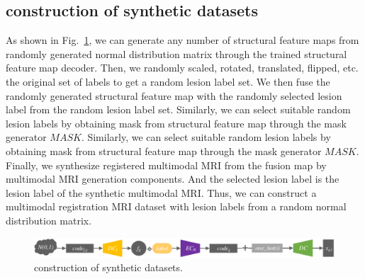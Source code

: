 \documentclass[letterpaper]{article} %
\begin{document}
\subsection{construction of synthetic datasets}
\label{make dataset}
As shown in Fig.~\ref{make_data}, we can generate any number of structural feature maps from randomly generated normal distribution matrix through the trained structural feature map decoder. Then, we randomly scaled, rotated, translated, flipped, etc. the original set of labels to get a random lesion label set. We then fuse the randomly generated structural feature map with the randomly selected lesion label from the random lesion label set. Similarly, we can select suitable random lesion labels by obtaining mask from structural feature map through the mask generator $MASK$. Similarly, we can select suitable random lesion labels by obtaining mask from structural feature map through the mask generator $MASK$. Finally, we synthesize registered multimodal MRI from the fusion map by multimodal MRI generation components. And the selected lesion label is the lesion label of the synthetic multimodal MRI. Thus, we can construct a multimodal registration MRI dataset with lesion labels from a random normal distribution matrix.
\begin{figure}
	\centering
	\includegraphics[width=0.98\columnwidth]{figures/make_data}
	\caption{construction of synthetic datasets.}
	\label{make_data}
\end{figure}
\end{document}
